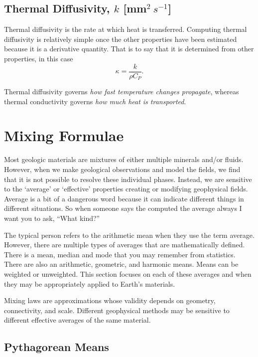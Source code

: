 \subsection{Thermal Diffusivity, $k$ [mm$^{2}~s^{-1}$]} \label{sec:diffusivity}
Thermal diffusivity is the rate at which heat is transferred.  Computing thermal
diffusivity is relatively simple once the other properties have been estimated
because it is a derivative quantity.  That is to say that it is determined from
other properties, in this case
\begin{equation}
    \kappa = \frac{k}{\rho C_P} .
\end{equation}

Thermal diffusivity governs \emph{how fast temperature changes propagate}, whereas thermal conductivity governs \emph{how much heat is transported}.


\section{Mixing Formulae}

Most geologic materials are mixtures of either multiple minerals and/or fluids.
However, when we make geological observations and model the fields, we find that
it is not possible to resolve these individual phases.  Instead, we are
sensitive to the `average' or `effective' properties creating or modifying
geophysical fields.  Average is a bit of a dangerous word because it can
indicate different things in different situations.  So when someone says the
computed the average always I want you to ask, ``What kind?''

The typical person refers to the arithmetic mean when they use the term average.
However, there are multiple types of averages that are mathematically defined.
There is a mean, median and mode that you may remember from statistics.  There
are also an arithmetic, geometric, and harmonic means.  Means can be weighted or
unweighted.  This section focuses on each of these averages and when they may
be appropriately applied to Earth's materials.

Mixing laws are approximations whose validity depends on geometry, connectivity,
and scale. Different geophysical methods may be sensitive to different effective
averages of the same material.

\subsection{Pythagorean Means}

